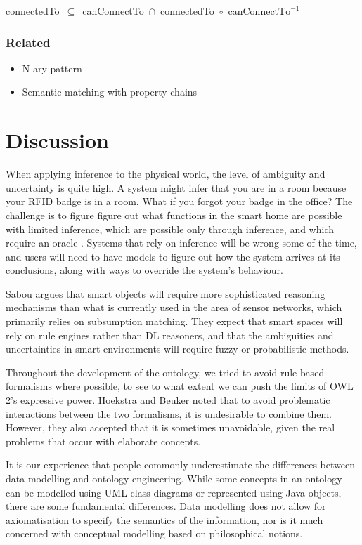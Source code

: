 \noindent
connectedTo~\ensuremath{\subseteq}~canConnectTo~\ensuremath{\cap}~connectedTo~\ensuremath{\circ}~$\text{canConnectTo}^{-1}$\\


\subsubsection{Related} 

\begin{itemize}
	\item N-ary pattern 
	\item Semantic matching with property chains
\end{itemize}


\section{Discussion}

When applying inference to the physical world, the level of ambiguity and uncertainty is quite high. A system might infer that you are in a room because your RFID badge is in a room. What if you forgot your badge in the office? The challenge is to figure figure out what functions in the smart home are possible with limited inference, which are possible only through inference, and which require an oracle \cite{Edwards2001}. Systems that rely on inference will be wrong some of the time, and users will need to have models to figure out how the system arrives at its conclusions, along with ways to override the system's behaviour.

Sabou \cite{Sabou2010} argues that smart objects will require more sophisticated reasoning mechanisms than what is currently used in the area of sensor networks, which primarily relies on subsumption matching. They expect that smart spaces will rely on rule engines rather than DL reasoners, and that the ambiguities and uncertainties in smart environments will require fuzzy or probabilistic methods.

Throughout the development of the ontology, we tried to avoid rule-based formalisms where possible, to see to what extent we can push the limits of OWL 2's expressive power. Hoekstra and Beuker \cite{Hoekstra2008} noted that to avoid problematic interactions between the two formalisms, it is undesirable to combine them. However, they also accepted that it is sometimes unavoidable, given the real problems that occur with elaborate concepts. 

It is our experience that people commonly underestimate the differences between data modelling and ontology engineering. While some concepts in an ontology can be modelled using UML class diagrams or represented using Java objects, there are some fundamental differences. Data modelling does not allow for axiomatisation to specify the semantics of the information, nor is it much concerned with conceptual modelling based on philosophical notions. 

